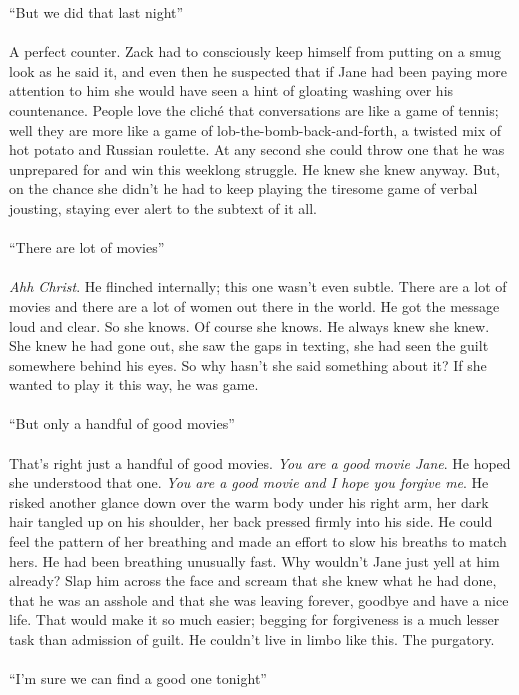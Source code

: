 \documentclass[12pt,oneside,openany]{memoir}
\begin{document}
“But we did that last night”
\\\\
A perfect counter. Zack had to consciously keep himself from putting on a smug look as he said it, and even then he suspected that if Jane had been paying more attention to him she would have seen a hint of gloating washing over his countenance. People love the cliché that conversations are like a game of tennis; well they are more like a game of lob-the-bomb-back-and-forth, a twisted mix of hot potato and Russian roulette. At any second she could throw one that he was unprepared for and win this weeklong struggle. He knew she knew anyway. But, on the chance she didn’t he had to keep playing the tiresome game of verbal jousting, staying ever alert to the subtext of it all.
\\\\
“There are lot of movies”
\\\\
\textit{Ahh Christ}. He flinched internally; this one wasn’t even subtle. There are a lot of movies and there are a lot of women out there in the world. He got the message loud and clear. So she knows. Of course she knows. He always knew she knew. She knew he had gone out, she saw the gaps in texting, she had seen the guilt somewhere behind his eyes. So why hasn’t she said something about it? If she wanted to play it this way, he was game.
\\\\
	“But only a handful of good movies”
\\\\	
That’s right just a handful of good movies. \textit{You are a good movie Jane}. He hoped she understood that one. \textit{You are a good movie and I hope you forgive me}. He risked another glance down over the warm body under his right arm, her dark hair tangled up on his shoulder, her back pressed firmly into his side. He could feel the pattern of her breathing and made an effort to slow his breaths to match hers. He had been breathing unusually fast. Why wouldn’t Jane just yell at him already? Slap him across the face and scream that she knew what he had done, that he was an asshole and that she was leaving forever, goodbye and have a nice life. That would make it so much easier; begging for forgiveness is a much lesser task than admission of guilt. He couldn’t live in limbo like this. The purgatory.
\\\\	
	“I’m sure we can find a good one tonight”
\\\\	
\end{document}
